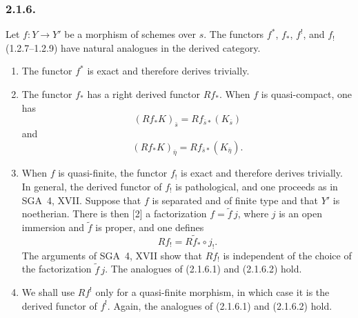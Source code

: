 \subsubsection*{2.1.6.}
Let $f:Y\longrightarrow Y'$ be a morphism of schemes over $s$.
The functors $f^*$, $f_*$, $f^!$, and $f_!$ (1.2.7--1.2.9) have
natural analogues in the derived category.
\begin{enumerate}[label=\alph*)]
\item The functor $f^*$ is exact and therefore derives trivially.

\item The functor $f_*$ has a right derived functor $Rf_*$.  When $f$
is quasi-compact, one has
\begin{equation}\tag{2.1.6.1}
(Rf_*K)_{\bar s}=Rf_{\bar s*}(K_{\bar s})
\end{equation}
and
\begin{equation}\tag{2.1.6.2}
(Rf_*K)_{\bar\eta}=Rf_{\bar s*}(K_{\bar\eta}).
\end{equation}

\item When $f$ is quasi-finite, the functor $f_!$ is exact and
therefore derives trivially.  In general, the derived functor of $f_!$
is pathological, and one proceeds as in SGA~4, XVII.  Suppose that $f$
is separated and of finite type and that $Y'$ is noetherian.  There is
then [2] a factorization $f=\widetilde f\,j$, where $j$ is an open
immersion and $\widetilde f$ is proper, and one defines
\begin{equation*}
Rf_!=R\widetilde f_*\circ j_!.
\end{equation*}
The arguments of SGA~4, XVII show that $Rf_!$ is independent of the
choice of the factorization $\widetilde f\,j$.  The analogues of
(2.1.6.1) and (2.1.6.2) hold.

\item We shall use $Rf^!$ only for a quasi-finite morphism, in which
case it is the derived functor of $f^!$.  Again, the analogues of
(2.1.6.1) and (2.1.6.2) hold.
\end{enumerate}

